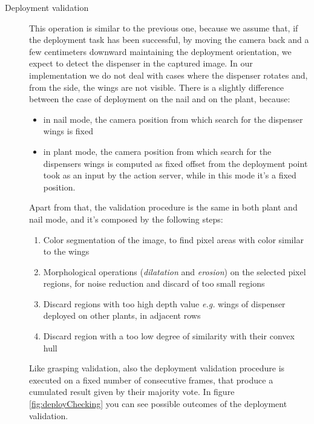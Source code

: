 \begin{description}
\item[Deployment validation] This operation is similar to the previous one, because we assume that, if the deployment task has been successful, by moving the camera back and a few centimeters downward maintaining the deployment orientation, we expect to detect the dispenser in the captured image. In our implementation we do not deal with cases where the dispenser rotates and, from the side, the wings are not visible. There is a slightly difference between the case of deployment on the nail and on the plant, because:
\begin{itemize}
	\item in nail mode, the camera position from which search for the dispenser wings is fixed
	\item in plant mode, the camera position from which search for the dispensers wings is computed as fixed offset from the deployment point took as an input by the action server, while in this mode it's a fixed position.
\end{itemize}
Apart from that, the validation procedure is the same in both plant and nail mode, and it's composed by the following steps:
	\begin{enumerate}
		\item Color segmentation of the image, to find pixel areas with color similar to the wings
		\item Morphological operations (\textit{dilatation} and \textit{erosion}) on the selected pixel regions, for noise reduction and discard of too small regions 
		\item Discard regions with too high depth value \textit{e.g.} wings of dispenser deployed on other plants, in adjacent rows
		\item Discard region with a too low degree of similarity with their convex hull
	\end{enumerate}
Like grasping validation, also the deployment validation procedure is executed on a fixed number of consecutive frames, that produce a cumulated result given by their majority vote.
In figure \ref{fig:deployChecking} you can see possible outcomes of the deployment validation.

\end{description}

